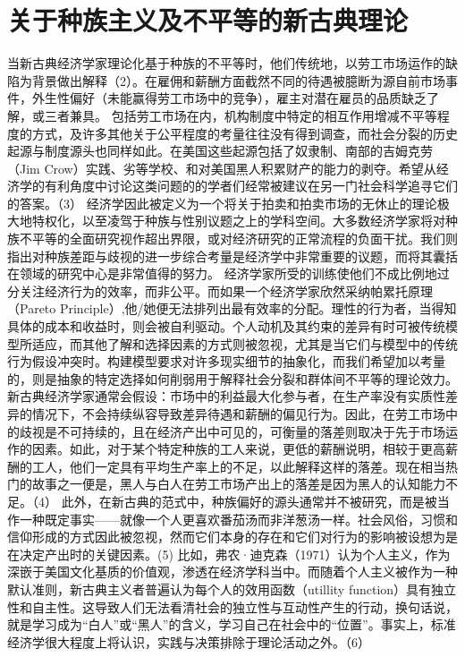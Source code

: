 \documentclass[UTF8]{ctexart}
\begin{document}
\section{关于种族主义及不平等的新古典理论}当新古典经济学家理论化基于种族的不平等时，他们传统地，以劳工市场运作的缺陷为背景做出解释（2）。在雇佣和薪酬方面截然不同的待遇被臆断为源自前市场事件，外生性偏好（未能赢得劳工市场中的竞争），雇主对潜在雇员的品质缺乏了解，或三者兼具。
包括劳工市场在内，机构制度中特定的相互作用增减不平等程度的方式，及许多其他关于公平程度的考量往往没有得到调查，而社会分裂的历史起源与制度源头也同样如此。在美国这些起源包括了奴隶制、南部的吉姆克劳（Jim Crow）实践、劣等学校、和对美国黑人积累财产的能力的剥夺。希望从经济学的有利角度中讨论这类问题的的学者们经常被建议在另一门社会科学追寻它们的答案。（3）
经济学因此被定义为一个将关于拍卖和拍卖市场的无休止的理论极大地特权化，以至凌驾于种族与性别议题之上的学科空间。大多数经济学家将对种族不平等的全面研究视作超出界限，或对经济研究的正常流程的负面干扰。我们则指出对种族差距与歧视的进一步综合考量是经济学中非常重要的议题，而将其囊括在领域的研究中心是非常值得的努力。
经济学家所受的训练使他们不成比例地过分关注经济行为的效率，而非公平。而如果一个经济学家欣然采纳帕累托原理（Pareto Principle）,他/她便无法排列出最有效率的分配。理性的行为者，当得知具体的成本和收益时，则会被自利驱动。个人动机及其约束的差异有时可被传统模型所适应，而其他了解和选择因素的方式则被忽视，尤其是当它们与模型中的传统行为假设冲突时。构建模型要求对许多现实细节的抽象化，而我们希望加以考量的，则是抽象的特定选择如何削弱用于解释社会分裂和群体间不平等的理论效力。
新古典经济学家通常会假设：市场中的利益最大化参与者，在生产率没有实质性差异的情况下，不会持续纵容导致差异待遇和薪酬的偏见行为。因此，在劳工市场中的歧视是不可持续的，且在经济产出中可见的，可衡量的落差则取决于先于市场运作的因素。如此，对于某个特定种族的工人来说，更低的薪酬说明，相较于更高薪酬的工人，他们一定具有平均生产率上的不足，以此解释这样的落差。现在相当热门的故事之一便是，黑人与白人在劳工市场产出上的落差是因为黑人的认知能力不足。（4）
此外，在新古典的范式中，种族偏好的源头通常并不被研究，而是被当作一种既定事实——就像一个人更喜欢番茄汤而非洋葱汤一样。社会风俗，习惯和信仰形成的方式因此被忽视，然而它们本身的存在和它们对行为的影响被设想为是在决定产出时的关键因素。(5)
比如，弗农·迪克森（1971）认为个人主义，作为深嵌于美国文化基质的价值观，渗透在经济学科当中。而随着个人主义被作为一种默认准则，新古典主义者普遍认为每个人的效用函数（utillity function）具有独立性和自主性。这导致人们无法看清社会的独立性与互动性产生的行动，换句话说，就是学习成为“白人”或“黑人”的含义，学习自己在社会中的“位置”。事实上，标准经济学很大程度上将认识，实践与决策排除于理论活动之外。（6）
\end{document}

